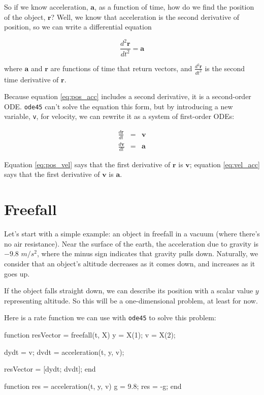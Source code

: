 \documentclass[
]{book}
\numberwithin{Answer}{chapter}
\numberwithin{Exercise}{chapter}
\renewcommand{\vec}[1]{\bm{\mathbf{#1}}}
\begin{document}
So if we know acceleration, $\vec{a}$, as a function of time, how do we
find the position of the object, $\vec{r}$?  Well, we know that acceleration
is the second derivative of position, so we can write a differential
equation

\begin{equation}\label{eq:pos_acc}
    \frac{d^2\vec{r}}{dt^2} = \vec{a}
\end{equation}

where $\vec{a}$ and $\vec{r}$ are functions of time that return vectors,
and $\frac{d^2\vec{r}}{dt^2}$ is the second time derivative of $\vec{r}$.

Because equation \eqref{eq:pos_acc} includes a second derivative, it is
a second-order ODE.  {\tt ode45} can't solve the equation this form, but
by introducing a new variable, {\tt v}, for velocity, we can rewrite it
as a system of first-order ODEs:

\begin{eqnarray}
    \label{eq:pos_vel}
    \frac{d\vec{r}}{dt} &=& \vec{v}     \\[6pt]
    \label{eq:vel_acc}
    \frac{d\vec{v}}{dt} &=& \vec{a}
\end{eqnarray}

Equation \eqref{eq:pos_vel} says that the first derivative of $\vec{r}$ is $\vec{v}$;
equation \eqref{eq:vel_acc} says that the first derivative of $\vec{v}$ is $\vec{a}$.


\section{Freefall}
\label{sect:freefall}

Let's start with a simple example: an object in freefall in a vacuum
(where there's no air resistance).  Near the surface of the earth, the
acceleration due to gravity is $-9.8$ $m/s^2$, where the minus sign
indicates that gravity pulls down.  Naturally, we consider that an 
object's altitude decreases as it comes down, and increases as it goes up.

If the object falls straight down, we can describe its position with a
scalar value $y$ representing altitude.  So this will be a
one-dimensional problem, at least for now.

Here is a rate function we can use with {\tt ode45} to solve
this problem:

\begin{code}
function resVector = freefall(t, X)
    y = X(1);      %
    v = X(2);      %

    dydt = v;
    dvdt = acceleration(t, y, v);

    resVector = [dydt; dvdt];    %
end

function res = acceleration(t, y, v)
    g = 9.8;     
    res = -g;     %
end
\end{code}
\end{document}
